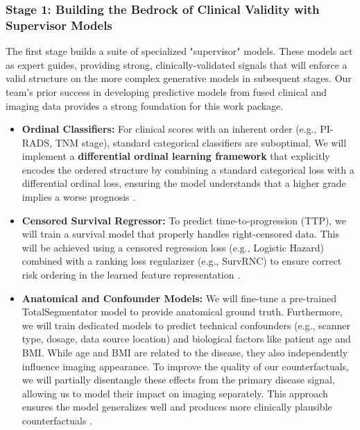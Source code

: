 \documentclass[11pt, a4paper]{article}
\begin{document}
\subsubsection{Stage 1: Building the Bedrock of Clinical Validity with Supervisor Models}
The first stage builds a suite of specialized "supervisor" models. These models act as expert guides, providing strong, clinically-validated signals that will enforce a valid structure on the more complex generative models in subsequent stages. Our team's prior success in developing predictive models from fused clinical and imaging data provides a strong foundation for this work package.
\begin{itemize}
    \item \textbf{Ordinal Classifiers:} For clinical scores with an inherent order (e.g., PI-RADS, TNM stage), standard categorical classifiers are suboptimal. We will implement a \textbf{differential ordinal learning framework} that explicitly encodes the ordered structure by combining a standard categorical loss with a differential ordinal loss, ensuring the model understands that a higher grade implies a worse prognosis \cite{LeeByeon2025, GrisiKartasalo2025}.
    \item \textbf{Censored Survival Regressor:} To predict time-to-progression (TTP), we will train a survival model that properly handles right-censored data. This will be achieved using a censored regression loss (e.g., Logistic Hazard) combined with a ranking loss regularizer (e.g., SurvRNC) to ensure correct risk ordering in the learned feature representation \cite{GaoLi2019, RivailVogl2023, ShahinZhao2023}.
    \item \textbf{Anatomical and Confounder Models:} We will fine-tune a pre-trained TotalSegmentator model \cite{Wasserthal_2023} to provide anatomical ground truth. Furthermore, we will train dedicated models to predict technical confounders (e.g., scanner type, dosage, data source location) and biological factors like patient age and BMI. While age and BMI are related to the disease, they also independently influence imaging appearance. To improve the quality of our counterfactuals, we will partially disentangle these effects from the primary disease signal, allowing us to model their impact on imaging separately. This approach ensures the model generalizes well and produces more clinically plausible counterfactuals \cite{PuglisiAlexander2025, ZhangHager2025}.
\end{itemize}
\end{document}
